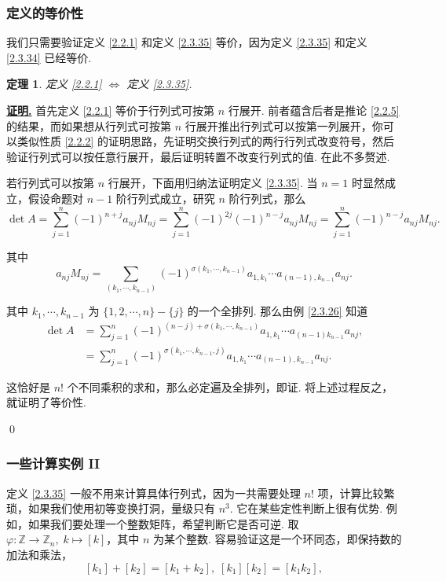 \documentclass[10pt,openany]{article}
\theoremstyle{thmstyle} %
\newtheorem{theorem}{定理}[subsection]
\theoremstyle{defstyle} %
\theoremstyle{prostyle} %
\theoremstyle{exastyle}
\theoremstyle{remstyle}
\renewenvironment{proof}[1][证明]{\par\underline{\textbf{#1.}} \;\fangsong}{\qed\par}
\begin{document}
\subsubsection{定义的等价性}

我们只需要验证定义 \ref{2.2.1} 和定义 \ref{2.3.35} 等价，因为定义 \ref{2.3.35} 和定义 \ref{2.3.34} 已经等价.

\begin{theorem}
	定义 \ref{2.2.1} \( \Leftrightarrow \) 定义 \ref{2.3.35}.
\end{theorem}

\begin{proof}
	首先定义 \ref{2.2.1} 等价于行列式可按第 \( n \) 行展开. 前者蕴含后者是推论 \ref{2.2.5} 的结果，而如果想从行列式可按第 \( n \) 行展开推出行列式可以按第一列展开，你可以类似性质 \ref{2.2.2} 的证明思路，先证明交换行列式的两行行列式改变符号，然后验证行列式可以按任意行展开，最后证明转置不改变行列式的值. 在此不多赘述.
	
	若行列式可以按第 \( n \) 行展开，下面用归纳法证明定义 \ref{2.3.35}. 当 \( n=1 \) 时显然成立，假设命题对 \( n-1 \) 阶行列式成立，研究 \( n \) 阶行列式，那么
	\[ \det A= \sum_{j=1}^{n} (-1)^{n+j} a_{nj} M_{nj}= \sum_{j=1}^{n} (-1)^{2j} (-1)^{n-j} a_{nj} M_{nj}= \sum_{j=1}^{n}  (-1)^{n-j} a_{nj} M_{nj}. \]
	
	其中 
	\[ a_{nj}M_{nj}= \sum_{(k_1,\cdots,k_{n-1}) }^{} (-1)^{\sigma(k_1,\cdots,k_{n-1})} a_{1,k_1}\cdots a_{(n-1),k_{n-1}} a_{nj}. \]
	
	其中 \( k_1,\cdots,k_{n-1} \) 为 \( \{1,2,\cdots,n\}-\{j\} \) 的一个全排列. 那么由例 \ref{2.3.26} 知道
	\begin{align*}
		\det A &= \sum_{j=1}^{n}  (-1)^{(n-j)+\sigma(k_1,\cdots,k_{n-1})} a_{1,k_1}\cdots a_{(n-1)k_{n-1}} a_{nj}, \\
		&= \sum_{j=1}^{n}  (-1)^{\sigma(k_1,\cdots,k_{n-1},j)} a_{1,k_1}\cdots a_{(n-1),k_{n-1}}a_{nj}.
	\end{align*}
    
    这恰好是 \( n! \) 个不同乘积的求和，那么必定遍及全排列，即证. 将上述过程反之，就证明了等价性.
    
\end{proof}

\subsubsection{一些计算实例 II}

定义 \ref{2.3.35} 一般不用来计算具体行列式，因为一共需要处理 \( n! \) 项，计算比较繁琐，如果我们使用初等变换打洞，量级只有 \( n^3 \). 它在某些定性判断上很有优势. 例如，如果我们要处理一个整数矩阵，希望判断它是否可逆. 取 \( \varphi: \mathbb{Z} \to \mathbb{Z}_n, \; k \mapsto [k] \)，其中 \( n \) 为某个整数. 容易验证这是一个环同态，即保持数的加法和乘法，
\[ [k_1]+[k_2]=[k_1+k_2], \; [k_1][k_2]=[k_1k_2], \]
\end{document}
